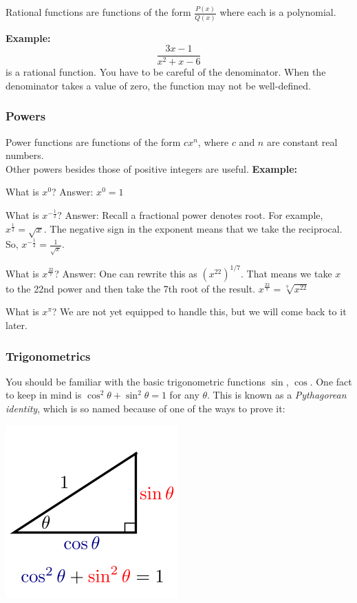 \documentclass[twoside,openright,titlepage,a4paper]{book}
\begin{document}
\begin{sloppypar}
Rational functions are functions of the form ${\displaystyle\frac{P(x)}{Q(x)}}$ where each is a polynomial.

\textbf{Example:}
\begin{equation*} 
\displaystyle\frac{3x-1}{x^{2}+x-6} 
\end{equation*}
is a rational function. You have to be careful of the denominator. When the denominator takes a value of zero, the function may not be well-defined.

\subsubsection{Powers}

Power functions are functions of the form ${cx^{n}}$, where $c$ and $n$ are constant real numbers.\\
Other powers besides those of positive integers are useful.
\bigbreak
\noindent \textbf{Example:}

What is ${x^{0}}$? Answer: ${x^{0}=1}$

What is ${x^{-\frac{1}{2}}}$? Answer: Recall a fractional power denotes root. For example, ${x^{\frac{1}{2}}=\sqrt{x}}$. The negative sign in the exponent means that we take the reciprocal. So, ${x^{-\frac{1}{2}}=\frac{1}{\sqrt{x}}}$.

What is ${x^\frac{22}{7}}$? Answer: One can rewrite this as ${\left(x^{22}\right)^{1/7}}$. That means we take $x$ to the 22nd power and then take the 7th root of the result.
${x^\frac{22}{7}=\sqrt[7]{x^{22}}}$\

What is ${x^{\pi}}$? We are not yet equipped to handle this, but we will come back to it later.

\subsubsection{Trigonometrics}

You should be familiar with the basic trigonometric functions $\sin$, $\cos$. One fact to keep in mind is ${\cos^{2} \theta +\sin^{2} \theta=1}$ for any $\theta$. This is known as a \textit{Pythagorean identity}, which is so named because of one of the ways to prove it:
\begin{center}
\includegraphics[scale=0.6]{Pythagorean}
\end{center}


\end{sloppypar}
\end{document}
